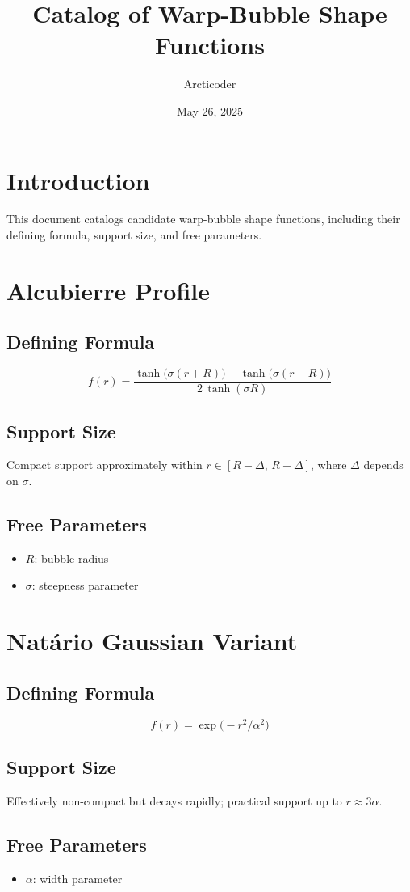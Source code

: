 \documentclass[11pt]{article}
\title{Catalog of Warp-Bubble Shape Functions}
\author{Arcticoder}
\date{May 26, 2025}
\begin{document}
\maketitle

\section*{Introduction}
This document catalogs candidate warp-bubble shape functions, including their defining formula, support size, and free parameters.

\section{Alcubierre Profile}
\subsection*{Defining Formula}
\[
f(r) = \frac{\tanh\bigl(\sigma (r + R)\bigr) - \tanh\bigl(\sigma (r - R)\bigr)}{2\,\tanh(\sigma R)}
\]
\subsection*{Support Size}
Compact support approximately within $r \in [R - \Delta,\, R + \Delta]$, where $\Delta$ depends on $\sigma$.
\subsection*{Free Parameters}
\begin{itemize}
  \item $R$: bubble radius
  \item $\sigma$: steepness parameter
\end{itemize}

\section{Natário Gaussian Variant}
\subsection*{Defining Formula}
\[
f(r) = \exp\!\bigl(-r^2 / \alpha^2\bigr)
\]
\subsection*{Support Size}
Effectively non-compact but decays rapidly; practical support up to $r \approx 3\alpha$.
\subsection*{Free Parameters}
\begin{itemize}
  \item $\alpha$: width parameter
\end{itemize}

\end{document}
